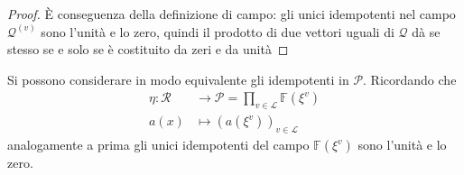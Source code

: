 \begin{proof}
   È conseguenza della definizione di campo: gli unici idempotenti nel campo $\mathcal{Q}^{(v)}$ sono l'unità e lo zero, quindi il prodotto di due vettori uguali di $\mathcal{Q}$ dà se stesso se e solo se è costituito da zeri e da unità
\end{proof}
\noindent
\begin{osservazione}
   Si possono considerare in modo equivalente gli idempotenti in $\mathcal{P}$. Ricordando che 
   \begin{align*}
      \eta:  \mathcal{R} &\longrightarrow \mathcal{P} =  \prod_{v\in \mathscr{L}} \mathbb{F}(\xi^{v}) \\
	a(x) &\longmapsto  (a(\xi^{v}))_{v\in \mathscr{L}}
    \end{align*}
    analogamente a prima gli unici idempotenti del campo $\mathbb{F}(\xi^{v})$ sono l'unità e lo zero.
\end{osservazione}

